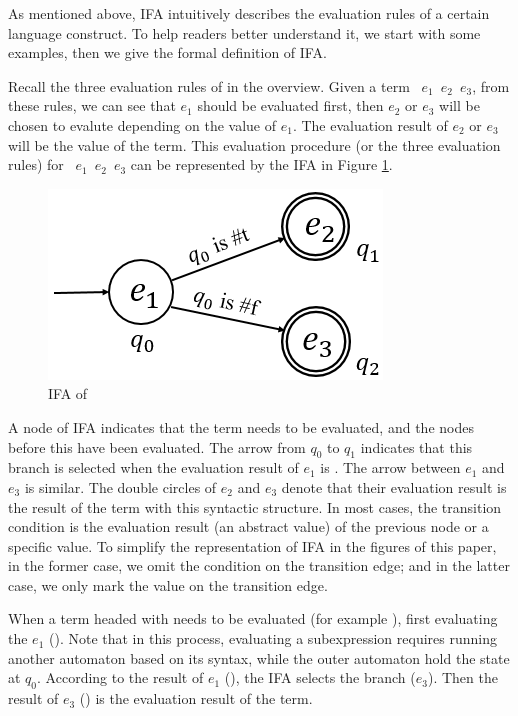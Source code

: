 As mentioned above, IFA intuitively describes the evaluation rules of a certain language construct. To help readers better understand it, we start with some examples, then we give the formal definition of IFA.

\begin{example}[IFA of~~ \m{if}]

Recall the three evaluation rules of  in the overview. Given a term ~$e_1$~$e_2$~$e_3$, from these rules, we can see that $e_1$ should be evaluated first, then $e_2$ or $e_3$ will be chosen to evalute depending on the value of $e_1$. The evaluation result of $e_2$ or $e_3$ will be the value of the term. This evaluation procedure (or the three evaluation rules) for ~$e_1$~$e_2$~$e_3$ can be represented by the IFA in Figure \ref{fig:ifa-if}.

\begin{figure}[t]
    \centering
    \includegraphics[scale=0.25]{images/ifa/ifa-if.png}
    \caption{IFA of }
    \label{fig:ifa-if}
\end{figure}

A node of IFA indicates that the term needs to be evaluated, and the nodes before this have been evaluated. The arrow from $q_0$ to $q_1$ indicates that this branch is selected when the evaluation result of $e_1$ is . The arrow between $e_1$ and $e_3$ is similar. The double circles of $e_2$ and $e_3$ denote that their evaluation result is the result of the term with this syntactic structure. In most cases, the transition condition is the evaluation result (an abstract value) of the previous node or a specific value. To simplify the representation of IFA in the figures of this paper, in the former case, we omit the condition on the transition edge; and in the latter case, we only mark the value on the transition edge.

When a term headed with  needs to be evaluated (for example ), first evaluating the $e_1$ (). Note that in this process, evaluating a subexpression requires running another automaton based on its syntax, while the outer automaton hold the state at $q_0$. According to the result of $e_1$ (), the IFA selects the branch ($e_3$). Then the result of $e_3$ () is the evaluation result of the term.
\myend
\end{example}

